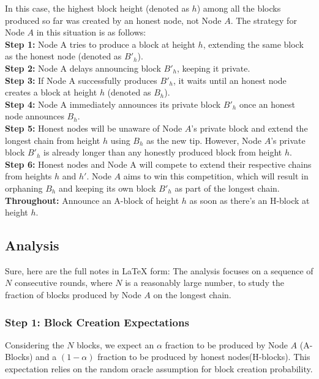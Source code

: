 In this case, the highest block height (denoted as $h$) among all the blocks produced so far was created by an honest node, not Node $A$. The strategy for Node $A$ in this situation is as follows:\\
\noindent
\textbf{Step 1:} Node A tries to produce a block at height $h$, extending the same block as the honest node (denoted as $B'_h$).\\
\noindent
\textbf{Step 2:} Node A delays announcing block $B'_h$, keeping it private.\\
\noindent
\textbf{Step 3:} If Node A successfully produces $B'_h$, it waits until an honest node creates a block at height $h$ (denoted as $B_h$).\\
\noindent
\textbf{Step 4:} Node A immediately announces its private block $B'_h$ once an honest node announces $B_h$.\\
\noindent
\textbf{Step 5:} Honest nodes will be unaware of Node $A$'s private block and extend the longest chain from height $h$ using $B_h$ as the new tip. However, Node $A$'s private block $B'_h$ is already longer than any honestly produced block from height $h$.\\
\noindent
\textbf{Step 6:} Honest nodes and Node A will compete to extend their respective chains from heights $h$ and $h'$. Node $A$ aims to win this competition, which will result in orphaning $B_h$ and keeping its own block $B'_h$ as part of the longest chain.\\

\noindent
\textbf{Throughout:} Announce an A-block of height $h$ as soon as there's an H-block at height $h$.

\subsection{Analysis}
Sure, here are the full notes in LaTeX form:
The analysis focuses on a sequence of $N$ consecutive rounds, where $N$ is a reasonably large number, to study the fraction of blocks produced by Node $A$ on the longest chain.

\subsubsection*{Step 1: Block Creation Expectations}
Considering the $N$ blocks, we expect an $\alpha$ fraction to be produced by Node $A$ (A-Blocks) and a $(1 - \alpha)$ fraction to be produced by honest nodes(H-blocks). This expectation relies on the random oracle assumption for block creation probability.

